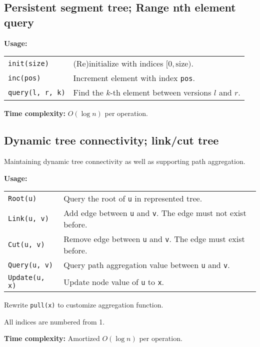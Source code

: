 \subsection{Persistent segment tree; Range nth element query}
\textbf{Usage:} \\[0.1cm]
\begin{tabular}{p{4cm} p{7.5cm}}
  \lstinline|init(size)| & (Re)initialize with indices $[0, \mathrm{size})$. \\
  \lstinline|inc(pos)| & Increment element with index \lstinline|pos|.\\
  \lstinline|query(l, r, k)| & Find the $k$-th element between versions $l$ and $r$. \\
\end{tabular} \par
\textbf{Time complexity:} $O(\log n)$ per operation. \par


\subsection{Dynamic tree connectivity; link/cut tree}
Maintaining dynamic tree connectivity as well as supporting path aggregation. \par
\textbf{Usage:} \\[0.1cm]
\begin{tabular}{p{3cm} p{8.5cm}}
  \lstinline|Root(u)| & Query the root of \lstinline|u| in represented tree. \\
  \lstinline|Link(u, v)| & Add edge between \lstinline|u| and \lstinline|v|. The edge must not exist before. \\
  \lstinline|Cut(u, v)| & Remove edge between \lstinline|u| and \lstinline|v|. The edge must exist before. \\
  \lstinline|Query(u, v)| & Query path aggregation value between \lstinline|u| and \lstinline|v|. \\
  \lstinline|Update(u, x)| & Update node value of \lstinline|u| to \lstinline|x|. \\
\end{tabular} \par
Rewrite \lstinline|pull(x)| to customize aggregation function. \par
\Warning All indices are numbered from 1. \par
\textbf{Time complexity:} Amortized $O(\log n)$ per operation. \par


